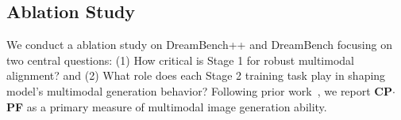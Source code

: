 









\subsection{Ablation Study}
\label{sec:ablation}

We conduct a ablation study on DreamBench++ and DreamBench focusing on two central questions: (1) How critical is Stage 1 for robust multimodal alignment? and (2) What role does each Stage 2 training task play in shaping model’s multimodal generation behavior?
Following prior work~\citep{peng2025dreambenchpp}, we report \textbf{CP$\cdot$PF} as a primary measure of multimodal image generation ability.

